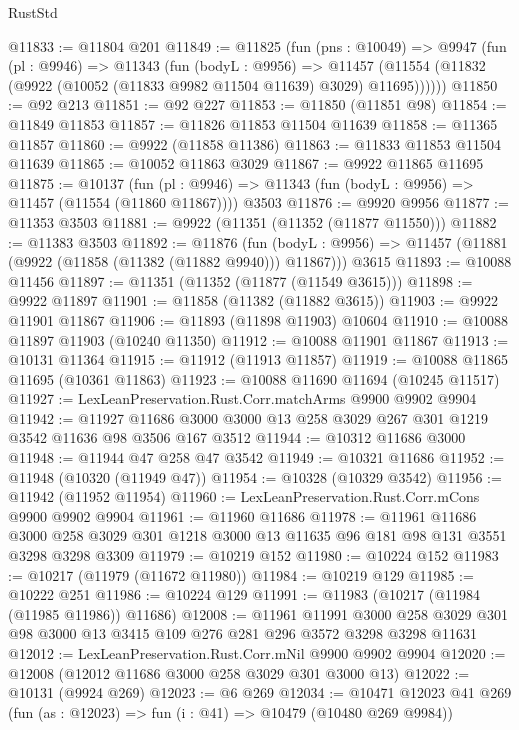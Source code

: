 \begin{lexlean}{RustStd}
\begin{coremodule}
@11833 := @11804 @201
@11849 := @11825
    (fun (pns : @10049) =>
    @9947
      (fun (pl : @9946) =>
      @11343
        (fun (bodyL : @9956) =>
        @11457 (@11554 (@11832 (@9922 (@10052 (@11833 @9982 @11504 @11639) @3029) @11695))))))
@11850 := @92 @213
@11851 := @92 @227
@11853 := @11850 (@11851 @98)
@11854 := @11849 @11853
@11857 := @11826 @11853 @11504 @11639
@11858 := @11365 @11857
@11860 := @9922 (@11858 @11386)
@11863 := @11833 @11853 @11504 @11639
@11865 := @10052 @11863 @3029
@11867 := @9922 @11865 @11695
@11875 := @10137
    (fun (pl : @9946) => @11343 (fun (bodyL : @9956) => @11457 (@11554 (@11860 @11867))))
    @3503
@11876 := @9920 @9956
@11877 := @11353 @3503
@11881 := @9922 (@11351 (@11352 (@11877 @11550)))
@11882 := @11383 @3503
@11892 := @11876
    (fun (bodyL : @9956) => @11457 (@11881 (@9922 (@11858 (@11382 (@11882 @9940))) @11867)))
    @3615
@11893 := @10088 @11456
@11897 := @11351 (@11352 (@11877 (@11549 @3615)))
@11898 := @9922 @11897
@11901 := @11858 (@11382 (@11882 @3615))
@11903 := @9922 @11901 @11867
@11906 := @11893 (@11898 @11903) @10604
@11910 := @10088 @11897 @11903 (@10240 @11350)
@11912 := @10088 @11901 @11867
@11913 := @10131 @11364
@11915 := @11912 (@11913 @11857)
@11919 := @10088 @11865 @11695 (@10361 @11863)
@11923 := @10088 @11690 @11694 (@10245 @11517)
@11927 := LexLeanPreservation.Rust.Corr.matchArms @9900 @9902 @9904
@11942 := @11927 @11686 @3000 @3000 @13 @258 @3029 @267 @301 @1219 @3542 @11636 @98 @3506 @167 @3512
@11944 := @10312 @11686 @3000
@11948 := @11944 @47 @258 @47 @3542
@11949 := @10321 @11686
@11952 := @11948 (@10320 (@11949 @47))
@11954 := @10328 (@10329 @3542)
@11956 := @11942 (@11952 @11954)
@11960 := LexLeanPreservation.Rust.Corr.mCons @9900 @9902 @9904
@11961 := @11960 @11686
@11978 := @11961
    @11686
    @3000
    @258
    @3029
    @301
    @1218
    @3000
    @13
    @11635
    @96
    @181
    @98
    @131
    @3551
    @3298
    @3298
    @3309
@11979 := @10219 @152
@11980 := @10224 @152
@11983 := @10217 (@11979 (@11672 @11980))
@11984 := @10219 @129
@11985 := @10222 @251
@11986 := @10224 @129
@11991 := @11983 (@10217 (@11984 (@11985 @11986)) @11686)
@12008 := @11961
    @11991
    @3000
    @258
    @3029
    @301
    @98
    @3000
    @13
    @3415
    @109
    @276
    @281
    @296
    @3572
    @3298
    @3298
    @11631
@12012 := LexLeanPreservation.Rust.Corr.mNil @9900 @9902 @9904
@12020 := @12008 (@12012 @11686 @3000 @258 @3029 @301 @3000 @13)
@12022 := @10131 (@9924 @269)
@12023 := @6 @269
@12034 := @10471
    @12023
    @41
    @269
    (fun (as : @12023) => fun (i : @41) => @10479 (@10480 @269 @9984))

\end{coremodule}
\end{lexlean}
